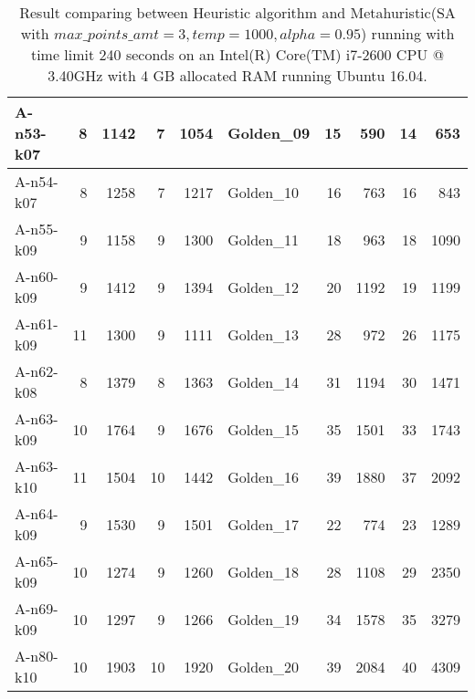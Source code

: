 \begin{table}[!h]
\begin{center}
\begin{tabular}{|l|r|r|r|r|l|r|r|r|r|}
    A-n53-k07 & 8 & 1142 & 7 & 1054 & Golden\_09 & 15 & 590 & 14 & 653 \\ \hline
    A-n54-k07 & 8 & 1258 & 7 & 1217 & Golden\_10 & 16 & 763 & 16 & 843 \\ \hline
    A-n55-k09 & 9 & 1158 & 9 & 1300 & Golden\_11 & 18 & 963 & 18 & 1090 \\ \hline
    A-n60-k09 & 9 & 1412 & 9 & 1394 & Golden\_12 & 20 & 1192 & 19 & 1199 \\ \hline
    A-n61-k09 & 11 & 1300 & 9 & 1111 & Golden\_13 & 28 & 972 & 26 & 1175 \\ \hline
    A-n62-k08 & 8 & 1379 & 8 & 1363 & Golden\_14 & 31 & 1194 & 30 & 1471 \\ \hline
    A-n63-k09 & 10 & 1764 & 9 & 1676 & Golden\_15 & 35 & 1501 & 33 & 1743 \\ \hline
    A-n63-k10 & 11 & 1504 & 10 & 1442 & Golden\_16 & 39 & 1880 & 37 & 2092 \\ \hline
    A-n64-k09 & 9 & 1530 & 9 & 1501 & Golden\_17 & 22 & 774 & 23 & 1289 \\ \hline
    A-n65-k09 & 10 & 1274 & 9 & 1260 & Golden\_18 & 28 & 1108 & 29 & 2350 \\ \hline
    A-n69-k09 & 10 & 1297 & 9 & 1266 & Golden\_19 & 34 & 1578 & 35 & 3279 \\ \hline
    A-n80-k10 & 10 & 1903 & 10 & 1920 & Golden\_20 & 39 & 2084 & 40 & 4309 \\ \hline
    \end{tabular}
    \end{center}
    \caption{Result comparing between Heuristic algorithm and Metahuristic(SA with $max\_points\_amt = 3, temp = 1000, alpha=0.95$) running with time limit 240 seconds on an Intel(R) Core(TM) i7-2600 CPU @ 3.40GHz with 4 GB allocated RAM running Ubuntu 16.04.}
    \label{table:cost}
    \end{table}
    